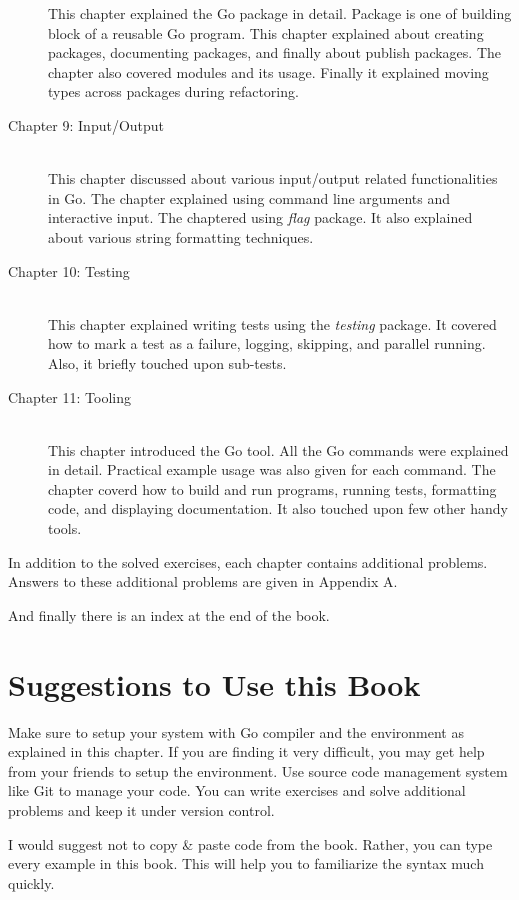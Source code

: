 \begin{description}
This chapter explained the Go package in detail. Package is one of building
block of a reusable Go program. This chapter explained about creating packages,
documenting packages, and finally about publish packages. The chapter also
covered modules and its usage. Finally it explained moving types across packages
during refactoring.
\item[Chapter 9: Input/Output] \hfill \\
This chapter discussed about various input/output related functionalities in Go.
The chapter explained using command line arguments and interactive input. The
chaptered using \textit{flag} package. It also explained about various string
formatting techniques.
\item[Chapter 10: Testing] \hfill \\
This chapter explained writing tests using the \textit{testing} package. It
covered how to mark a test as a failure, logging, skipping, and parallel
running. Also, it briefly touched upon sub-tests.
\item[Chapter 11: Tooling] \hfill \\
This chapter introduced the Go tool. All the Go commands were explained in
detail. Practical example usage was also given for each command. The chapter
coverd how to build and run programs, running tests, formatting code, and
displaying documentation. It also touched upon few other handy tools.
\end{description}

In addition to the solved exercises, each chapter contains additional problems.
Answers to these additional problems are given in Appendix A.

And finally there is an index at the end of the book.

\section{Suggestions to Use this Book}

Make sure to setup your system with Go compiler and the environment as explained
in this chapter. If you are finding it very difficult, you may get help from
your friends to setup the environment. Use source code management system like
Git to manage your code. You can write exercises and solve additional problems
and keep it under version control.

I would suggest not to copy \& paste code from the book. Rather, you can type
every example in this book. This will help you to familiarize the syntax much
quickly.

